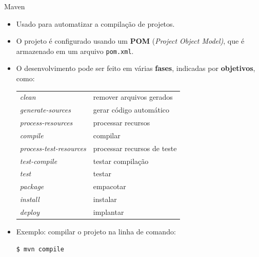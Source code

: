 \begin{frame}[fragile]{Maven}
  \begin{itemize}
    \item Usado para automatizar a compilação de projetos.
    \item O projeto é configurado usando um \textbf{POM} (\emph{Project
      Object Model)}, que é armazenado em um arquivo \texttt{pom.xml}.
    \item O desenvolvimento pode ser feito em várias \textbf{fases},
    indicadas por \textbf{objetivos}, como:
    \begin{center}
      \begin{tabular}{ll}
        \textit{clean}                  & remover arquivos gerados    \\
        \textit{generate-sources}       & gerar código automático     \\
        \textit{process-resources}      & processar recursos          \\
        \textit{compile}                & compilar                    \\
        \textit{process-test-resources} & processar recursos de teste \\
        \textit{test-compile}           & testar compilação           \\
        \textit{test}                   & testar                      \\
        \textit{package}                & empacotar                   \\
        \textit{install}                & instalar                    \\
        \textit{deploy}                 & implantar
      \end{tabular}
    \end{center}
    \item Exemplo: compilar o projeto na linha de comando:
\begin{Verbatim}[frame=single]
$ mvn compile
\end{Verbatim}
  \end{itemize}
\end{frame}

